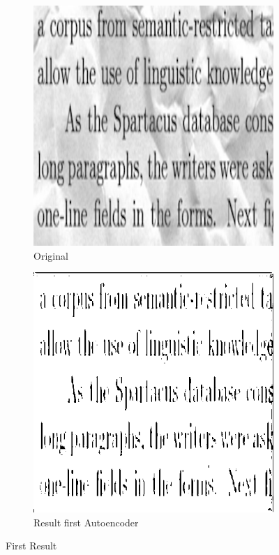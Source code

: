 \documentclass[%
 reprint,
 amsmath,amssymb,
 aps,
]{revtex4-1}
\begin{document}
\begin{figure}%
\centering
\begin{subfigure}{.9\columnwidth}
\includegraphics[width=\columnwidth]{original-k}%
\caption{Original}%
\label{subfiga}%
\end{subfigure}\hfill%
\begin{subfigure}{.9\columnwidth}
\includegraphics[width=\columnwidth]{autoEncoder-k}%
\caption{Result first Autoencoder}%
\label{subfigb}%
\end{subfigure}\hfill%
\caption{First Result}
\label{figabc}
\end{figure}
\end{document}

